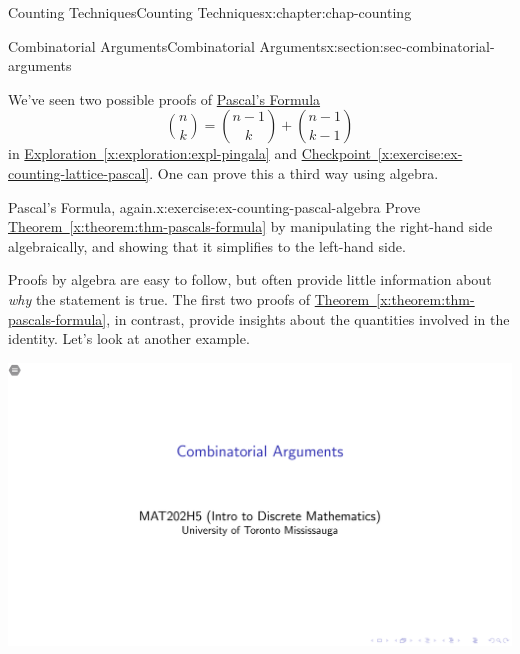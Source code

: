 \documentclass[oneside,10pt,]{book}
\newcommand{\xreffont}{\relax}
\numberwithin{equation}{section}
\newlength{\qrsize}
\newlength{\previewwidth}
\begin{document}
\begin{chapterptx}{Counting Techniques}{}{Counting Techniques}{}{}{x:chapter:chap-counting}
\begin{sectionptx}{Combinatorial Arguments}{}{Combinatorial Arguments}{}{}{x:section:sec-combinatorial-arguments}
\par
We've seen two possible proofs of \hyperref[x:theorem:thm-pascals-formula]{Pascal's Formula}%
\begin{equation*}
\binom{n}{k} = \binom{n-1}{k} + \binom{n-1}{k-1}
\end{equation*}
in \hyperref[x:exploration:expl-pingala]{Exploration~{\xreffont\ref{x:exploration:expl-pingala}}} and \hyperref[x:exercise:ex-counting-lattice-pascal]{Checkpoint~{\xreffont\ref{x:exercise:ex-counting-lattice-pascal}}}. One can prove this a third way using algebra.%
\begin{inlineexercise}{Pascal's Formula, again.}{x:exercise:ex-counting-pascal-algebra}%
Prove \hyperref[x:theorem:thm-pascals-formula]{Theorem~{\xreffont\ref{x:theorem:thm-pascals-formula}}} by manipulating the right-hand side algebraically, and showing that it simplifies to the left-hand side.%
\end{inlineexercise}
Proofs by algebra are easy to follow, but often provide little information about \emph{why} the statement is true. The first two proofs of \hyperref[x:theorem:thm-pascals-formula]{Theorem~{\xreffont\ref{x:theorem:thm-pascals-formula}}}, in contrast, provide insights about the quantities involved in the identity. Let's look at another example.%
\begin{sidebyside}{1}{0}{0}{0}%
\begin{sbspanel}{1}%
\setlength{\qrsize}{9em}
\setlength{\previewwidth}{\linewidth}
\addtolength{\previewwidth}{-\qrsize}
\begin{tcbraster}[raster columns=2, raster column skip=1pt, raster halign=center, raster force size=false, raster left skip=0pt, raster right skip=0pt]%
\begin{tcolorbox}[previewstyle, width=\previewwidth]%
\includegraphics[width=0.80\linewidth,height=\qrsize,keepaspectratio]{images/09-thumb.png}%
\end{tcolorbox}%
\begin{tcolorbox}[qrstyle]%

\end{tcolorbox}
\end{tcbraster}
\end{sbspanel}
\end{sidebyside}
\end{sectionptx}
\end{chapterptx}
\end{document}

